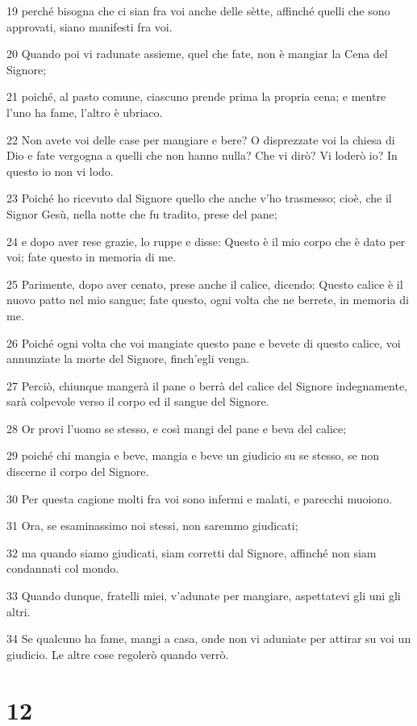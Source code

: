 \par 19 perché bisogna che ci sian fra voi anche delle sètte, affinché quelli che sono approvati, siano manifesti fra voi.
\par 20 Quando poi vi radunate assieme, quel che fate, non è mangiar la Cena del Signore;
\par 21 poiché, al pasto comune, ciascuno prende prima la propria cena; e mentre l'uno ha fame, l'altro è ubriaco.
\par 22 Non avete voi delle case per mangiare e bere? O disprezzate voi la chiesa di Dio e fate vergogna a quelli che non hanno nulla? Che vi dirò? Vi loderò io? In questo io non vi lodo.
\par 23 Poiché ho ricevuto dal Signore quello che anche v'ho trasmesso; cioè, che il Signor Gesù, nella notte che fu tradito, prese del pane;
\par 24 e dopo aver rese grazie, lo ruppe e disse: Questo è il mio corpo che è dato per voi; fate questo in memoria di me.
\par 25 Parimente, dopo aver cenato, prese anche il calice, dicendo: Questo calice è il nuovo patto nel mio sangue; fate questo, ogni volta che ne berrete, in memoria di me.
\par 26 Poiché ogni volta che voi mangiate questo pane e bevete di questo calice, voi annunziate la morte del Signore, finch'egli venga.
\par 27 Perciò, chiunque mangerà il pane o berrà del calice del Signore indegnamente, sarà colpevole verso il corpo ed il sangue del Signore.
\par 28 Or provi l'uomo se stesso, e così mangi del pane e beva del calice;
\par 29 poiché chi mangia e beve, mangia e beve un giudicio su se stesso, se non discerne il corpo del Signore.
\par 30 Per questa cagione molti fra voi sono infermi e malati, e parecchi muoiono.
\par 31 Ora, se esaminassimo noi stessi, non saremmo giudicati;
\par 32 ma quando siamo giudicati, siam corretti dal Signore, affinché non siam condannati col mondo.
\par 33 Quando dunque, fratelli miei, v'adunate per mangiare, aspettatevi gli uni gli altri.
\par 34 Se qualcuno ha fame, mangi a casa, onde non vi aduniate per attirar su voi un giudicio. Le altre cose regolerò quando verrò.

\chapter{12}

